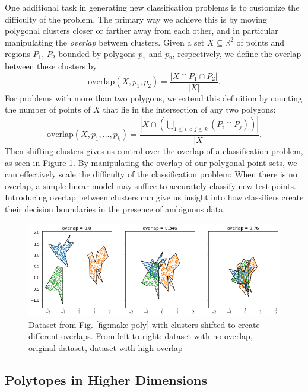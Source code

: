 \documentclass[manuscript,screen,review]{acmart}
\begin{document}
One additional task in generating new classification problems is to customize the difficulty of the problem.
The primary way we achieve this is by moving polygonal clusters closer or farther away from each other, and in
particular manipulating the \textit{overlap} between clusters. Given a set $X \subseteq \mathbb{R}^2$ of points
and regions $P_1$, $P_2$ bounded by polygons $p_1$ and $p_2$, respectively, we define the overlap between these
clusters by
\[
    \mathrm{overlap}(X, p_1, p_2) = \frac{|X \cap P_1 \cap P_2|}{|X|}.
\]
For problems with more than two polygons, we extend this definition by counting the number of points of $X$ that lie
in the intersection of any two polygons:
\[
    \mathrm{overlap}(X, p_1, \dots, p_k)
    = \frac{\left|X \cap \left(\bigcup_{1 \leq i < j \leq k} (P_i \cap P_j) \right) \right|}{|X|}.
\]
Then shifting clusters gives us control over the overlap of a classification problem, as seen in Figure \ref{fig:overlap_ex}.
By manipulating the overlap of our polygonal point sets, we can effectively scale the difficulty of the classification
problem: When there is no overlap, a simple linear model may suffice to accurately classify new test points. Introducing
overlap between clusters can give us insight into how classifiers create their decision boundaries in the presence of
ambiguous data.

\begin{figure}
    \centering
    \includegraphics[width=.8\textwidth]{images/overlap.png}
    \caption{Dataset from Fig. \ref{fig:make-poly} with clusters shifted to create different overlaps.
    From left to right: dataset with no overlap, original dataset, dataset with high overlap}
    \label{fig:overlap_ex}
\end{figure}

\subsection{Polytopes in Higher Dimensions}
\end{document}
